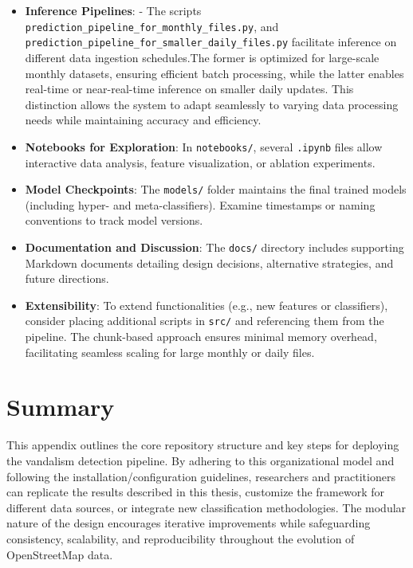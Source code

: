 \documentclass[
    13pt, %
    a4paper, %
    listof=totoc, %
    bibliography=totoc, %
    index=totoc, %
    headsepline
]{scrreprt}
\begin{document}
\begin{itemize}
    \item \textbf{Inference Pipelines}:
    - The scripts \newline \texttt{prediction\_pipeline\_for\_monthly\_files.py}, and \newline \texttt{prediction\_pipeline\_for\_smaller\_daily\_files.py} facilitate inference on different data ingestion schedules.The former is optimized for large-scale monthly datasets, ensuring efficient batch processing, while the latter enables real-time or near-real-time inference on smaller daily updates. This distinction allows the system to adapt seamlessly to varying data processing needs while maintaining accuracy and efficiency.

    \item \textbf{Notebooks for Exploration}:
    In \texttt{notebooks/}, several \texttt{.ipynb} files allow interactive data analysis, feature visualization, or ablation experiments.

    \item \textbf{Model Checkpoints}:
    The \texttt{models/} folder maintains the final trained models (including hyper- and meta-classifiers). Examine timestamps or naming conventions to track model versions.

    \item \textbf{Documentation and Discussion}:
    The \texttt{docs/} directory includes supporting Markdown documents detailing design decisions, alternative strategies, and future directions.

    \item \textbf{Extensibility}:
    To extend functionalities (e.g., new features or classifiers), consider placing additional scripts in \texttt{src/} and referencing them from the pipeline. The chunk-based approach ensures minimal memory overhead, facilitating seamless scaling for large monthly or daily files.
\end{itemize}

\section{Summary}
\label{sec:appendix_summary}

This appendix outlines the core repository structure and key steps for deploying the vandalism detection pipeline. By adhering to this organizational model and following the installation/configuration guidelines, researchers and practitioners can replicate the results described in this thesis, customize the framework for different data sources, or integrate new classification methodologies. The modular nature of the design encourages iterative improvements while safeguarding consistency, scalability, and reproducibility throughout the evolution of OpenStreetMap data.
\end{document}
